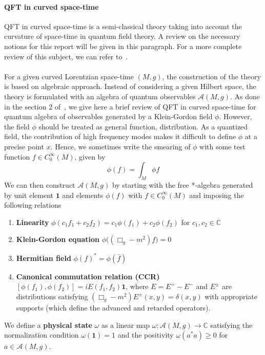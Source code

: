 \paragraph{QFT in curved space-time}
QFT in curved space-time is a semi-classical theory taking into account the curvature of space-time in quantum field theory.
A review on the necessary notions for this report will be given in this paragraph.
For a more complete review of this subject, we can refer to~\cite{Hollands2014}. \\\\
%
For a given curved Lorentzian space-time $(M,g)$,
the construction of the theory is based on algebraic approach.
Instead of considering a given Hilbert space, 
the theory is formulated with an algebra of quantum observables $\mathscr{A}(M,g)$.
As done in the section 2 of~\cite{Hollands2014}, we give here a brief review of QFT in curved space-time for quantum algebra of observables generated by a Klein-Gordon field $\phi$. 
However, the field $\phi$ should be treated as general function, \ie  distribution.
As a quantized field, the contribution of high frequency modes makes it difficult to define $\phi$ at a precise point $x$.
Hence, we sometimes write the smearing of $\phi$ with some test function $f\in C^\infty_0(M)$, given by
\begin{equation*}
\phi(f) = \int_M \phi f
\end{equation*}
We can then construct $\mathscr{A}(M,g)$ by starting with the free *-algebra generated by unit element $\mathbf{1}$ and elements $\phi(f)$ with $f\in C^\infty_0(M)$ and imposing the following relations \\
\begin{enumerate}
\item \textbf{Linearity} $\phi(c_1 f_1 + c_2 f_2) = c_1 \phi(f_1) + c_2 \phi(f_2)$ for $c_1, c_2 \in \mathbb{C}$
%
\item \textbf{Klein-Gordon equation} $\phi\big( (\Box_g - m^2)f \big) = 0$
%
\item \textbf{Hermitian field} $\phi(f)^* = \phi(\bar{f})$
%
\item \textbf{Canonical commutation relation (CCR)} $[\phi(f_1), \phi(f_2)] = iE(f_1, f_2) \mathbf{1}$, where $E = E^+ - E^-$ and $E^\pm$ are distributions satisfying $(\Box_g - m^2)E^\pm(x,y) = \delta(x,y)$ with appropriate supports (which define the advanced and retarded operators).
\end{enumerate}
%
We define a \textbf{physical state} $\omega$ as a linear map
$\omega: \mathscr{A}(M,g) \rightarrow \mathbb{C}$ satisfying the normalization condition $\omega(\mathbf{1}) = 1$ and the positivity $\omega(a^*a) \geq 0$ for $a\in\mathscr{A}(M,g)$.
